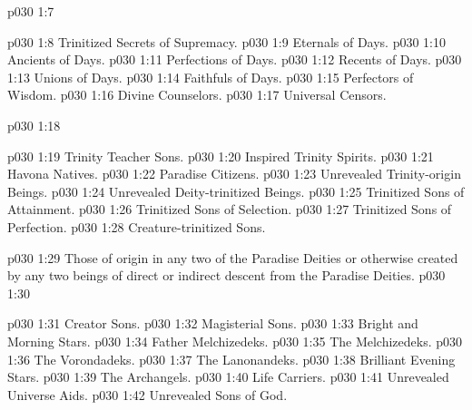 \pc \vs p030 1:7 \bibnobreakspace {}
\begin{ubquote}
\pc \vs p030 1:8 \bibnobreakspace Trinitized Secrets of Supremacy.
\vs p030 1:9 \bibnobreakspace Eternals of Days.
\vs p030 1:10 \bibnobreakspace Ancients of Days.
\vs p030 1:11 \bibnobreakspace Perfections of Days.
\vs p030 1:12 \bibnobreakspace Recents of Days.
\vs p030 1:13 \bibnobreakspace Unions of Days.
\vs p030 1:14 \bibnobreakspace Faithfuls of Days.
\vs p030 1:15 \bibnobreakspace Perfectors of Wisdom.
\vs p030 1:16 \bibnobreakspace Divine Counselors.
\vs p030 1:17 \bibnobreakspace Universal Censors.
\end{ubquote}
\pc \vs p030 1:18 \bibnobreakspace {}
\begin{ubquote}
\pc \vs p030 1:19 \bibnobreakspace Trinity Teacher Sons.
\vs p030 1:20 \bibnobreakspace Inspired Trinity Spirits.
\vs p030 1:21 \bibnobreakspace Havona Natives.
\vs p030 1:22 \bibnobreakspace Paradise Citizens.
\vs p030 1:23 \bibnobreakspace Unrevealed Trinity\hyp{}origin Beings.
\vs p030 1:24 \bibnobreakspace Unrevealed Deity\hyp{}trinitized Beings.
\vs p030 1:25 \bibnobreakspace Trinitized Sons of Attainment.
\vs p030 1:26 \bibnobreakspace Trinitized Sons of Selection.
\vs p030 1:27 \bibnobreakspace Trinitized Sons of Perfection.
\vs p030 1:28 \bibnobreakspace Creature\hyp{}trinitized Sons.
\end{ubquote}
\pc \vs p030 1:29 \bibnobreakspace {} Those of origin in any two of the Paradise Deities or otherwise created by any two beings of direct or indirect descent from the Paradise Deities.
\pc \vs p030 1:30 \bibnobreakspace {}
\begin{ubquote}
\pc \vs p030 1:31 \bibnobreakspace Creator Sons.
\vs p030 1:32 \bibnobreakspace Magisterial Sons.
\vs p030 1:33 \bibnobreakspace Bright and Morning Stars.
\vs p030 1:34 \bibnobreakspace Father Melchizedeks.
\vs p030 1:35 \bibnobreakspace The Melchizedeks.
\vs p030 1:36 \bibnobreakspace The Vorondadeks.
\vs p030 1:37 \bibnobreakspace The Lanonandeks.
\vs p030 1:38 \bibnobreakspace Brilliant Evening Stars.
\vs p030 1:39 \bibnobreakspace The Archangels.
\vs p030 1:40 \bibnobreakspace Life Carriers.
\vs p030 1:41 \bibnobreakspace Unrevealed Universe Aids.
\vs p030 1:42 \bibnobreakspace Unrevealed Sons of God.
\end{ubquote}
